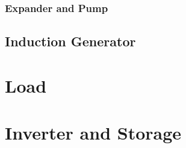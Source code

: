 \subsubsection{Expander and Pump}

\subsection{Induction Generator}

\section{Load}

\section{Inverter and Storage}